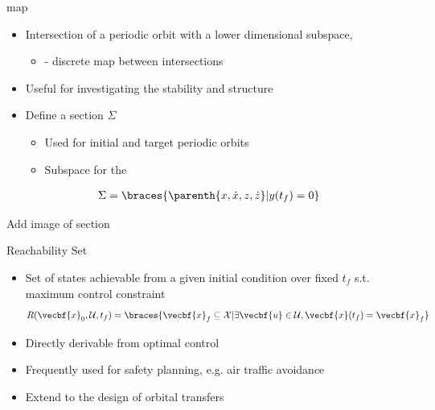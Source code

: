 \begin{frame}{\Poincare map}
\begin{itemize}
    \item Intersection of a periodic orbit with a lower dimensional subspace,
    \pause
        \begin{itemize}
            \item  {} - discrete map between intersections
        \end{itemize}
        \pause
    \item Useful for investigating the stability and structure 
    \pause
    \item Define a \Poincare section \( \Sigma \) 
        \begin{itemize}
            \item Used for initial and target periodic orbits
            \item Subspace for the 
        \end{itemize}
\end{itemize}

\begin{align*}
    \Sigma = \braces{\parenth{x, \dot{x}, z, \dot{z}} | y(t_f) = 0 }
\end{align*}

{\LARGE Add image of \Poincare section}
\end{frame}

\begin{frame}{Reachability Set}

\begin{itemize}
    \item Set of states achievable from a given initial condition over fixed \( t_f \) s.t. maximum control constraint
    \[
        R( \vecbf{x}_0, \mathcal{U} , t_f) = \braces{ \vecbf{x}_f \subseteq \mathcal{X} | \exists \vecbf{u} \in \mathcal{U}, \vecbf{x}(t_f) = \vecbf{x}_f }
    \]
    \pause
    \item Directly derivable from optimal control
    \item Frequently used for safety planning, e.g. air traffic avoidance
    \pause
    \item Extend to the design of orbital transfers
\end{itemize}

\end{frame}

